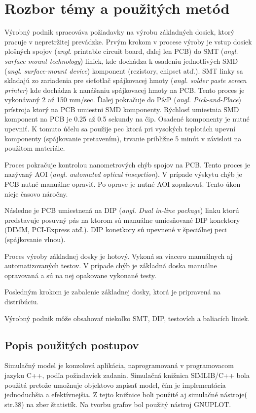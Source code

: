 \documentclass[12pt,a4paper,titlepage,final]{article}
\begin{document}
\section{Rozbor témy a použitých metód}
Výrobný podnik spracováva požiadavky na výrobu základných dosiek, ktorý pracuje
v nepretržitej prevádzke. Prvým krokom v procese výroby je vstup dosiek plošných
spojov (\textit{angl.} printable circuit board, ďalej len PCB) do SMT\cite{SMT}
(\textit{angl. surface mount-technology}) liniek, kde dochádza k osadeniu jednotlivých
SMD (\textit{angl. surface-mount device})\cite{SMT} komponent (rezistory, chipset atď.).
SMT linky sa skladajú zo zariadenia pre sieťotlač spájkovacej 
hmoty (\textit{angl. solder paste screen printer})\cite{screen-printer-DEK} kde
dochádza k nanášaniu spájkovacej hmoty na PCB. Tento proces je vykonávaný
2 až 150 mm/sec. Ďalej pokračuje do P\&P (\textit{angl. Pick-and-Place})\cite{smt-PNP}
prístroja ktorý na PCB umiestni SMD komponenty. Rýchlosť umiestnia SMD komponent
na PCB je 0.25 až 0.5 sekundy na čip. Osadené komponenty je nutné upevniť.
K tomuto účelu sa použije pec\cite{reflow-oven} ktorá pri vysokých teplotách upevní komponenty
(spájkovanie pretavením), trvanie približne 5 minút v závisloti na použitom materiále. 

Proces pokračuje kontrolou nanometrových chýb spojov na PCB. Tento proces je 
nazývaný AOI (\textit{angl. automated optical insepction})\cite{AOI}. V prípade výskytu
chýb je PCB nutné manuálne opraviť. Po oprave je nutné AOI zopakovať. Tento
úkon nieje časovo náročny.

Následne je PCB umiestnená na DIP (\textit{angl. Dual in-line package})
linku ktorú predstavuje posuvný pás na ktorom sú manuálne umiesňované 
DIP konektory (DIMM, PCI-Express atď.). DIP konetkory sú upevnené v špeciálnej
peci (spájkovanie vlnou).

Proces výroby základnej dosky je hotový. Vykoná sa viacero manuálnych aj automatizovaných
testov. V prípade chýb je základná doska manuálne opravovaná a sú na nej opakovane vykonané
testy.

Posledným krokom je zabalenie základnej dosky, ktorá je pripravená na distribúciu.

Výrobný podnik môže obsahovať niekoľko SMT, DIP, testovích a baliacích liniek.

\subsection{Popis použitých postupov}
Simulačný model je konzolová aplikácia, naprogramovaná v programovacom jazyku
C++, podľa požiadaviek zadania. Simulačná knižnica SIMLIB/C++\cite{SIMLIB} bola použitá pretože
umožnuje objektovo zapísať model, čím je implementácia jednoduchšia a efektívnejšia.
Z tejto knižnice boli použité aj simulačné nástroje(\cite{peringer-slidy} str.38) na zber
štatistík. Na tvorbu grafov bol použitý nástroj GNUPLOT\cite{gnuplot}.
\end{document}
